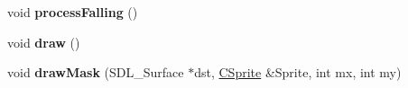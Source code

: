 \begin{DoxyCompactItemize}
\item 
\hypertarget{class_c_object_a7731ccfa9a7b19a23a16d318eddcb524}{
void {\bfseries processFalling} ()}
\label{class_c_object_a7731ccfa9a7b19a23a16d318eddcb524}

\item 
\hypertarget{class_c_object_ada3a757db19644b3df85fbdf04b899fb}{
void {\bfseries draw} ()}
\label{class_c_object_ada3a757db19644b3df85fbdf04b899fb}

\item 
\hypertarget{class_c_object_a97105dde922077fd9dd0b6b046f3fbc1}{
void {\bfseries drawMask} (SDL\_\-Surface $\ast$dst, \hyperlink{class_c_sprite}{CSprite} \&Sprite, int mx, int my)}
\label{class_c_object_a97105dde922077fd9dd0b6b046f3fbc1}

\end{DoxyCompactItemize}

